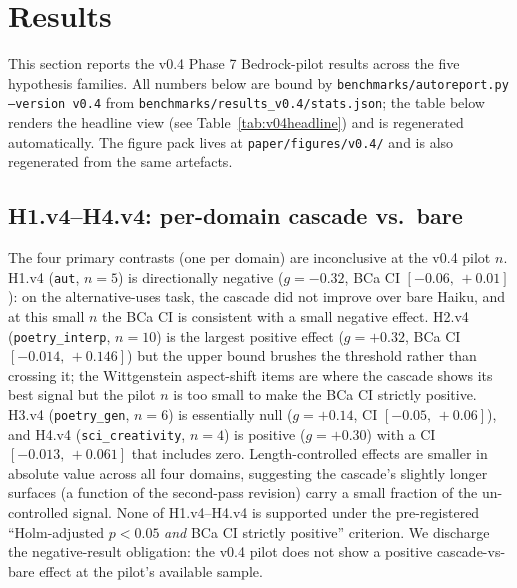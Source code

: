 \section{Results}\label{sec:results}

This section reports the v0.4 Phase 7 Bedrock-pilot results across the five hypothesis families. All numbers below are bound by \texttt{benchmarks/autoreport.py --version v0.4} from \texttt{benchmarks/results\_v0.4/stats.json}; the table below renders the headline view (see Table~\ref{tab:v04headline}) and is regenerated automatically. The figure pack lives at \texttt{paper/figures/v0.4/} and is also regenerated from the same artefacts.

\begin{table}[ht]
\centering
\caption{v0.4 headline result summary. ``$g$'' is Hedges' $g$ with small-sample correction; ``BCa CI'' is a 10,000-resample bias-corrected and accelerated bootstrap interval; ``perm.~$p$'' is a one-sided paired permutation $p$-value (exact for $n\le 18$); ``Holm~$p$'' is the Holm--Bonferroni-adjusted family-wise $p$ across $\{H_1,\ldots,H_4\}$. ``supported'' requires both Holm~$p<0.05$ \emph{and} a strictly positive BCa CI.}
\label{tab:v04headline}

\end{table}

\subsection{H1.v4--H4.v4: per-domain cascade vs.\ bare}\label{sec:results_h1_h4}

The four primary contrasts (one per domain) are inconclusive at the v0.4 pilot $n$. H1.v4 (\texttt{aut}, $n=5$) is directionally negative ($g=-0.32$, BCa CI $[-0.06,\,+0.01]$): on the alternative-uses task, the cascade did not improve over bare Haiku, and at this small $n$ the BCa CI is consistent with a small negative effect. H2.v4 (\texttt{poetry\_interp}, $n=10$) is the largest positive effect ($g=+0.32$, BCa CI $[-0.014,\,+0.146]$) but the upper bound brushes the threshold rather than crossing it; the Wittgenstein aspect-shift items are where the cascade shows its best signal but the pilot $n$ is too small to make the BCa CI strictly positive. H3.v4 (\texttt{poetry\_gen}, $n=6$) is essentially null ($g=+0.14$, CI $[-0.05,\,+0.06]$), and H4.v4 (\texttt{sci\_creativity}, $n=4$) is positive ($g=+0.30$) with a CI $[-0.013,\,+0.061]$ that includes zero. Length-controlled effects are smaller in absolute value across all four domains, suggesting the cascade's slightly longer surfaces (a function of the second-pass revision) carry a small fraction of the un-controlled signal. None of H1.v4--H4.v4 is supported under the pre-registered ``Holm-adjusted $p<0.05$ \emph{and} BCa CI strictly positive'' criterion. We discharge the negative-result obligation: the v0.4 pilot does not show a positive cascade-vs-bare effect at the pilot's available sample.

